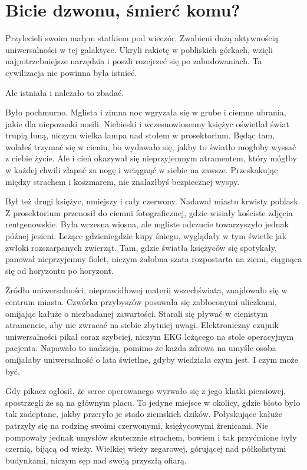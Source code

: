 \chapter{Bicie dzwonu, śmierć komu?}


Przylecieli swoim małym statkiem pod wieczór.
Zwabieni dużą aktywnością uniwersalności w tej galaktyce.
Ukryli rakietę w pobliskich górkach, wzięli najpotrzebniejsze narzędzia i poszli rozejrzeć się po zabudowaniach.
Ta cywilizacja nie powinna była istnieć.

Ale istniała i należało to zbadać.

Było pochmurno.
Mglista i zimna noc wgryzała się w grube i ciemne ubrania, jakie dla niepoznaki nosili.
Niebieski i wczesnowiosenny księżyc oświetlał świat trupią łuną, niczym wielka lampa nad stołem w prosektorium.
Będąc tam, wolałeś trzymać się w cieniu, bo wydawało się, jakby to światło mogłoby wyssać z ciebie życie.
Ale i cień okazywał się nieprzyjemnym atramentem, który mógłby w każdej chwili złapać za nogę i wciągnąć w siebie na zawsze. 
Przeskakując między strachem i koszmarem, nie znalazłbyś bezpiecznej wyspy.

Był też drugi księżyc, mniejszy i cały czerwony.
Nadawał miastu krwisty poblask. 
Z prosektorium przenosił do ciemni fotograficznej, gdzie wisiały kościste zdjęcia rentgenowskie.
Była wczesna wiosna, ale mgliste odczucie towarzyszyło jednak późnej jesieni.
Leżące gdzieniegdzie kupy śniegu, wyglądały w tym świetle jak zwłoki rozszarpanych zwierząt.
Tam, gdzie światła księżyców się spotykały, panował nieprzyjemny fiolet, niczym żałobna szata rozpostarta na ziemi, ciągnąca się od horyzontu po horyzont.

Źródło uniwersalności, nieprawidłowej materii wszechświata, znajdowało się w centrum miasta.
Czwórka przybyszów posuwała się zabłoconymi uliczkami, omijając kałuże o niezbadanej zawartości.
Starali się pływać w cienistym atramencie, aby nie zwracać na siebie zbytniej uwagi.
Elektroniczny czujnik uniwersalności pikał coraz szybciej, niczym EKG leżącego na stole operacyjnym pacjenta.
Napawało to nadzieją, pomimo że każda zdrowa na umyśle osoba omijałaby uniwersalność o lata świetlne, gdyby wiedziała czym jest. I czym może być.

Gdy pikacz ogłosił, że serce operowanego wyrwało się z jego klatki piersiowej, spostrzegli że są na głównym placu. 
To jedyne miejsce w okolicy, gdzie błoto było tak zadeptane, jakby przeryło je stado ziemskich dzików.
Połyskujące kałuże patrzyły się na rodzinę swoimi czerwonymi, księżycowymi źrenicami.
Nie pompowały jednak umysłów skutecznie strachem, bowiem i tak przyćmione były czernią, bijącą od wieży.
Wielkiej wieży zegarowej, górującej nad półkolistymi budynkami, niczym sęp nad swoją przyszłą ofiarą.

